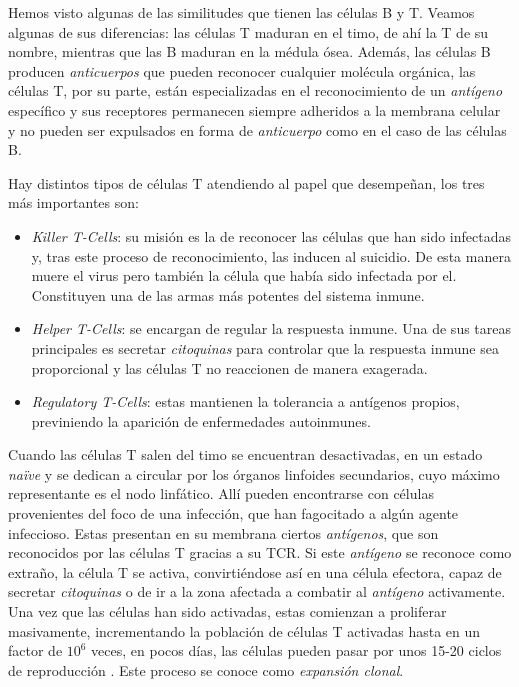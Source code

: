 Hemos visto algunas de las similitudes que tienen las células B y T. Veamos algunas de sus diferencias: las células T maduran en el timo, de ahí la T de su nombre, mientras que las B maduran en la médula ósea. Además, las células B producen \textit{anticuerpos} que pueden reconocer cualquier molécula orgánica, las células T, por su parte, están especializadas en el reconocimiento de un \textit{antígeno} específico y sus receptores permanecen siempre adheridos a la membrana celular y no pueden ser expulsados en forma de \textit{anticuerpo} como en el caso de las células B.

Hay distintos tipos de células T atendiendo al papel que desempeñan, los tres más importantes son: 
\begin{itemize}
	\item \textit{Killer T-Cells}: su misión es la de reconocer las células que han sido infectadas y, tras este proceso de reconocimiento, las inducen al suicidio. De esta manera muere el virus pero también la célula que había sido infectada por el. Constituyen una de las armas más potentes del sistema inmune.
	
	\item \textit{Helper T-Cells}: se encargan de regular la respuesta inmune. Una de sus tareas principales es secretar \textit{citoquinas} para controlar que la respuesta inmune sea proporcional y las células T no reaccionen de manera exagerada.
	
	\item \textit{Regulatory T-Cells}: estas mantienen la tolerancia a antígenos propios, previniendo la aparición de enfermedades autoinmunes.
\end{itemize}

Cuando las células T salen del timo se encuentran desactivadas, en un estado \textit{naïve} y se dedican a circular por los órganos linfoides secundarios, cuyo máximo representante es el nodo linfático. Allí pueden encontrarse con células provenientes del foco de una infección, que han fagocitado a algún agente infeccioso. Estas presentan en su membrana ciertos \textit{antígenos}, que son reconocidos por las células T gracias a su TCR. Si este \textit{antígeno} se reconoce como extraño, la célula T se activa, convirtiéndose así en una célula efectora, capaz de secretar \textit{citoquinas} o de ir a la zona afectada a combatir al \textit{antígeno} activamente. Una vez que las células han sido activadas, estas comienzan a proliferar masivamente, incrementando la población de células T activadas hasta en un factor de $10^6$ veces, en pocos días, las células pueden pasar por unos 15-20 ciclos de reproducción \citep{JTB}. Este proceso se conoce como \textit{expansión clonal}.


